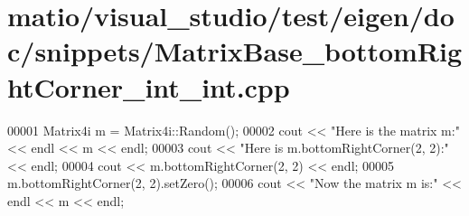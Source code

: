 \hypertarget{matio_2visual__studio_2test_2eigen_2doc_2snippets_2_matrix_base__bottom_right_corner__int__int_8cpp_source}{}\section{matio/visual\+\_\+studio/test/eigen/doc/snippets/\+Matrix\+Base\+\_\+bottom\+Right\+Corner\+\_\+int\+\_\+int.cpp}
\label{matio_2visual__studio_2test_2eigen_2doc_2snippets_2_matrix_base__bottom_right_corner__int__int_8cpp_source}

\begin{DoxyCode}
00001 Matrix4i m = Matrix4i::Random();
00002 cout << \textcolor{stringliteral}{"Here is the matrix m:"} << endl << m << endl;
00003 cout << \textcolor{stringliteral}{"Here is m.bottomRightCorner(2, 2):"} << endl;
00004 cout << m.bottomRightCorner(2, 2) << endl;
00005 m.bottomRightCorner(2, 2).setZero();
00006 cout << \textcolor{stringliteral}{"Now the matrix m is:"} << endl << m << endl;
\end{DoxyCode}
